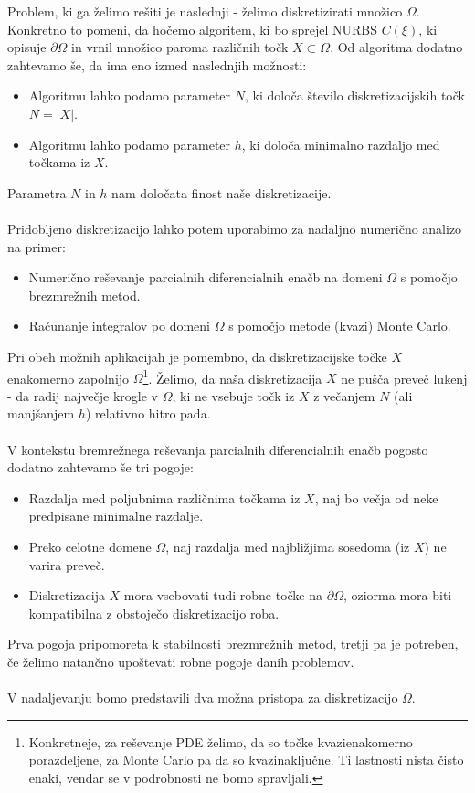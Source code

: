 \documentclass{article}
\begin{document}
Problem, ki ga želimo rešiti je naslednji - želimo diskretizirati množico $\Omega$.
Konkretno to pomeni, da hočemo algoritem, ki bo sprejel NURBS $C(\xi)$, ki opisuje $\partial \Omega$ in vrnil množico paroma različnih točk $X \subset \Omega$.
Od algoritma dodatno zahtevamo še, da ima eno izmed naslednjih možnosti:
\begin{itemize}
\item Algoritmu lahko podamo parameter $N$, ki določa število diskretizacijskih točk $N = |X|$.
\item Algoritmu lahko podamo parameter $h$, ki določa minimalno razdaljo med točkama iz $X$.
\end{itemize}
Parametra $N$ in $h$ nam določata finost naše diskretizacije.
\\
\\
Pridobljeno diskretizacijo lahko potem uporabimo za nadaljno numerično analizo na primer:
\begin{itemize}
\item Numerično reševanje parcialnih diferencialnih enačb na domeni $\Omega$ s pomočjo brezmrežnih metod.
\item Računanje integralov po domeni $\Omega$ s pomočjo metode (kvazi) Monte Carlo.
\end{itemize}
Pri obeh možnih aplikacijah je pomembno, da diskretizacijske točke $X$ enakomerno zapolnijo $\Omega$\footnote{Konkretneje, za reševanje PDE želimo, da so točke kvazienakomerno porazdeljene, za Monte Carlo pa da so kvazinaključne. Ti lastnosti nista čisto enaki, vendar se v podrobnosti ne bomo spravljali.}. Želimo, da naša diskretizacija $X$ ne pušča preveč lukenj - da radij največje krogle v $\Omega$, ki ne vsebuje točk iz $X$ z večanjem $N$ (ali manjšanjem $h$) relativno hitro pada.
\\
\\
V kontekstu bremrežnega reševanja parcialnih diferencialnih enačb pogosto dodatno zahtevamo še tri pogoje:
\begin{itemize}
\item Razdalja med poljubnima različnima točkama iz $X$, naj bo večja od neke predpisane minimalne razdalje.
\item Preko celotne domene $\Omega$, naj razdalja med najbližjima sosedoma (iz $X$) ne varira preveč.
\item Diskretizacija $X$ mora vsebovati tudi robne točke na $\partial \Omega$, oziorma mora biti kompatibilna z obstoječo diskretizacijo roba.
\end{itemize}
Prva pogoja pripomoreta k stabilnosti brezmrežnih metod, tretji pa je potreben, če želimo natančno upoštevati robne pogoje danih problemov.
\\
\\
V nadaljevanju bomo predstavili dva možna pristopa za diskretizacijo $\Omega$.
\end{document}
